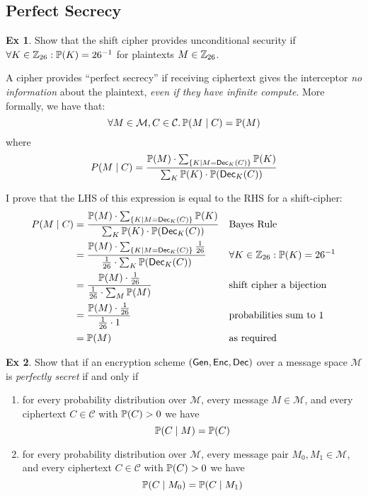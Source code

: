 \documentclass[10pt,\jkfside,a4paper]{article}
\theoremstyle{definition}
\newtheorem{ex}{Ex}
\begin{document}
\subsection{Perfect Secrecy}

\begin{ex}

    Show that the shift cipher provides unconditional security if $\forall K \in \mathbb{Z}_{26}: \mathbb{P}(K) = 26^{-1}$ for plaintexts $M \in \mathbb{Z}_{26}$.

\end{ex}

A cipher provides ``perfect secrecy'' if receiving ciphertext gives the interceptor \emph{no information} about the plaintext, \emph{even if they have infinite compute}. More formally, we have that:
\[
    \forall M \in \mathcal M, C \in \mathcal C\ldotp \mathbb{P}(M \mid C) = \mathbb{P}(M)
\]
where
\[
    P(M \mid C) = \frac{\mathbb{P}(M) \cdot \sum_{\{K \mid M = \mathsf{Dec}_K(C)\}} \mathbb{P}(K)}{\sum_K \mathbb{P}(K) \cdot \mathbb{P}(\mathsf{Dec}_K(C))}
\]

I prove that the LHS of this expression is equal to the RHS for a shift-cipher:
\begin{align*}
    P(M \mid C)
    &= \frac{\mathbb{P}(M) \cdot \sum_{\{K \mid M = \mathsf{Dec}_K(C)\}} \mathbb{P}(K)}{\sum_K \mathbb{P}(K) \cdot \mathbb{P}(\mathsf{Dec}_K(C))} &&\text{Bayes Rule} \\
    &= \frac{\mathbb{P}(M) \cdot \sum_{\{K \mid M = \mathsf{Dec}_K(C)\}} \frac{1}{26}}{\frac{1}{26} \cdot \sum_K \mathbb{P}(\mathsf{Dec}_K(C))} &&\text{$\forall K \in \mathbb{Z}_{26}: \mathbb{P}(K) = 26^{-1}$} \\
    &= \frac{\mathbb{P}(M) \cdot \frac{1}{26}}{\frac{1}{26} \cdot \sum_M \mathbb{P}(M)} &&\text{shift cipher a bijection}\\
    &= \frac{\mathbb{P}(M) \cdot \frac{1}{26}}{\frac{1}{26} \cdot 1} &&\text{probabilities sum to 1}\\
    &= \mathbb{P}(M) &&\text{as required}
\end{align*}

\begin{ex}

    Show that if an encryption scheme $(\mathsf{Gen}, \mathsf{Enc}, \mathsf{Dec})$ over a message space $\mathcal M$ is \emph{perfectly secret} if and only if

    \begin{enumerate}[label=(\textit{\alph*})]

        \item for every probability distribution over $\mathcal M$, every message $M \in \mathcal M$, and every ciphertext $C \in \mathcal C$ with $\mathbb{P}(C) > 0$ we have
        \[
            \mathbb{P}(C \mid M) = \mathbb{P}(C)
        \]

        \item for every probability distribution over $\mathcal M$, every message pair $M_0, M_1 \in \mathcal M$, and every ciphertext $C \in \mathcal C$ with $\mathbb{P}(C) > 0$ we have
        \[
            \mathbb{P}(C \mid M_0) = \mathbb{P}(C \mid M_1)
        \]

    \end{enumerate}

\end{ex}
\end{document}
